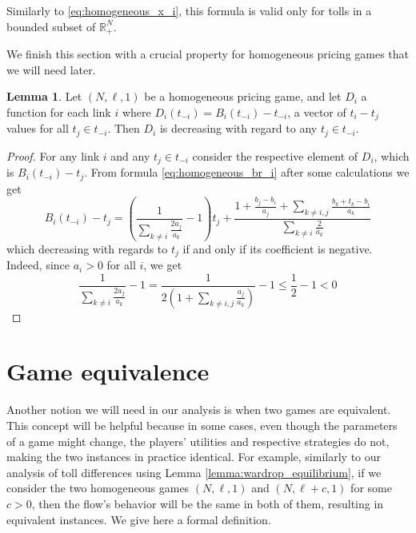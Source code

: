 \documentclass[10pt,a4paper]{book}
\newcommand{\R}{\mathbb{R}}
\theoremstyle{definition}
\newtheorem{lemma}[definition]{Lemma}
\theoremstyle{comment}
\begin{document}
Similarly to \ref{eq:homogeneous_x_i}, this formula is valid only for tolls in a bounded subset of $\R_+^N$.



We finish this section with a crucial property for homogeneous pricing games that we will need later.
\begin{lemma}
	\label{lemma:tolls_diff}
	Let $(N, \ell, 1)$ be a homogeneous pricing game, and let $D_i$ a function for each link $i$ where $D_i(t_{-i}) = B_i(t_{-i}) - t_{-i}$, a vector of $t_i - t_j$ values for all $t_j \in t_{-i}$.
	Then $D_i$ is decreasing with regard to any $t_j \in t_{-i}$.
\end{lemma}

\begin{proof}
	For any link $i$ and any $t_j \in t_{-i}$ consider the respective element of $D_i$, which is $B_i(t_{-i}) - t_j$.
	From formula \ref{eq:homogeneous_br_i} after some calculations we get
	\[
		B_i(t_{-i}) - t_j = \left(\frac{1}{\sum_{k \ne i} \frac{2a_j}{a_k}} - 1\right)t_j + \frac{1 + \frac{b_j - b_i}{a_j} + \sum_{k \ne i, j}\frac{b_k + t_k - b_i}{a_k}}{\sum_{k \ne i} \frac{2}{a_k}}
	\]
	which decreasing with regards to $t_j$ if and only if its coefficient is negative.
	Indeed, since $a_i > 0$ for all $i$, we get
	\[
		\frac{1}{\sum_{k \ne i} \frac{2a_j}{a_k}} - 1 = \frac{1}{2 \left(1 + \sum_{k \ne i, j} \frac{a_j}{a_k}\right)} - 1 \leq \frac{1}{2} - 1 < 0
	\]
\end{proof}

\section*{Game equivalence}

Another notion we will need in our analysis is when two games are equivalent.
This concept will be helpful because in some cases, even though the parameters of a game might change, the players' utilities and respective strategies do not, making the two instances in practice identical.
For example, similarly to our analysis of toll differences using Lemma \ref{lemma:wardrop_equilibrium}, if we consider the two homogeneous games $(N, \ell, 1)$ and $(N, \ell + c, 1)$ for some $c > 0$, then the flow's behavior will be the same in both of them, resulting in equivalent instances.
We give here a formal definition.
\end{document}

